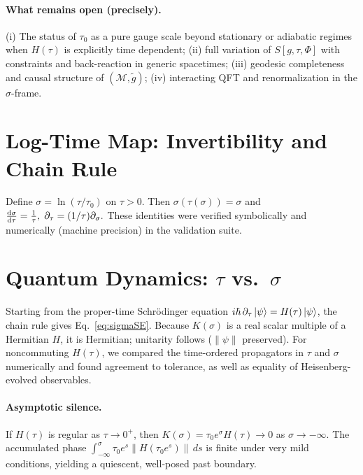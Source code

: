 \documentclass[11pt]{article}
\begin{document}
\paragraph{What remains open (precisely).}
(i) The status of \(\tau_0\) as a pure gauge scale beyond stationary or adiabatic regimes when \(H(\tau)\) is explicitly time dependent; (ii) full variation of \(S[g,\tau,\Phi]\) with constraints and back-reaction in generic spacetimes; (iii) geodesic completeness and causal structure of \((\mathcal M,\tilde g)\); (iv) interacting QFT and renormalization in the $\sigma$-frame.

\section{Log-Time Map: Invertibility and Chain Rule}
Define \(\sigma=\ln(\tau/\tau_0)\) on \(\tau>0\). Then \(\sigma(\tau(\sigma))=\sigma\) and
\(
\dv{\sigma}{\tau}=\frac{1}{\tau},\;
\partial_\tau=(1/\tau)\partial_\sigma.
\)
These identities were verified symbolically and numerically (machine precision) in the validation suite.

\section{Quantum Dynamics: $\tau$ vs.\ $\sigma$}
Starting from the proper-time Schr\"odinger equation \( i\hbar\,\partial_\tau\ket{\psi} = H(\tau)\ket{\psi}\), the chain rule gives Eq.~\eqref{eq:sigmaSE}.
Because \(K(\sigma)\) is a real scalar multiple of a Hermitian \(H\), it is Hermitian; unitarity follows (\(\|\psi\|\) preserved).
For noncommuting \(H(\tau)\), we compared the time-ordered propagators in $\tau$ and $\sigma$ numerically and found agreement to tolerance, as well as equality of Heisenberg-evolved observables.

\paragraph{Asymptotic silence.}
If \(H(\tau)\) is regular as \(\tau\to 0^+\), then \(K(\sigma)=\tau_0 e^\sigma H(\tau)\to 0\) as \(\sigma\to -\infty\). The accumulated phase \(\int_{-\infty}^{\sigma}\tau_0 e^{s}\|H(\tau_0 e^{s})\|\,ds\) is finite under very mild conditions, yielding a quiescent, well-posed past boundary.
\end{document}

